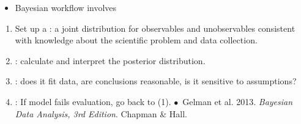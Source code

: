\documentclass[10pt]{report}
\begin{document}
\sf%
\mbox{ }
\\[12pt]
\\[8pt]
\\[36pt]
\noindent
{}
\\[4pt]
\\[2pt]
\vfill
\noindent
{} \hfill
{\small {}}


\begin{itemize}
\item Bayesian workflow involves
\end{itemize}

\begin{enumerate}
    \item Set up a : a joint
      distribution for observables and unobservables consistent with
      knowledge about the scientific problem and data collection.
    \item {}: calculate and interpret the
      posterior distribution.
    \item {}: does it fit
      data, are conclusions reasonable, is it sensitive to
      assumptions?
    \item {}: If model fails evaluation, go back to (1).
      \vfill
      {\footnotesize $\bullet$\ Gelman et al. 2013.  \textit{Bayesian Data
          Analysis, 3rd Edition}. Chapman \& Hall.}
    \end{enumerate}
    
\end{document}
